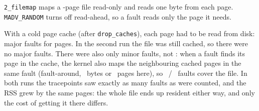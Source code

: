 \texttt{2\_filemap} maps a \FilePages{}-page file read-only and reads one byte
from each page. \texttt{MADV\_RANDOM} turns off read-ahead, so a fault reads
only the page it needs.

With a cold page cache (after \texttt{drop\_caches}), each page had to be read
from disk: \ColdMajor{} major faults for \FilePages{} pages. In the second run
the file was still cached, so there were no major faults. There were also
only \WarmMinor{} minor faults, not \FilePages{}: when a fault finds its page
in the cache, the kernel also maps the neighbouring cached pages in the same
fault (fault-around, \FaultAroundBytes{}~bytes or \FaultAroundPages{}~pages
here), so \FilePages{}~/~\FaultAroundPages{} faults cover the file. In both
runs the tracepoints saw exactly as many faults as were counted, and the RSS
grew by the same \FileRssGrowth{} pages: the whole file ends up resident
either way, and only the cost of getting it there differs.
